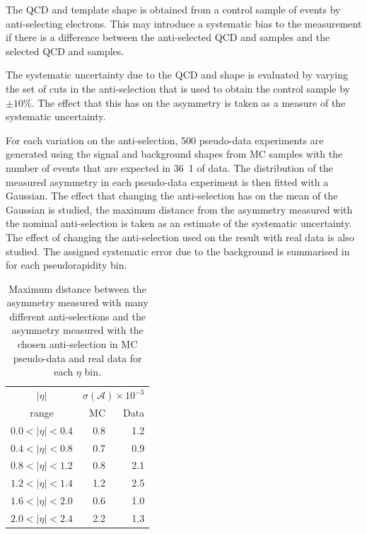 The {QCD} and \gjet \ETm template shape is obtained from a control sample of
events by anti-selecting electrons. This may introduce a systematic bias to the
measurement if there is a difference between the anti-selected {QCD} and \gjet
\ETm samples and the selected {QCD} and \gjet samples.

The systematic uncertainty due to the {QCD} and \gjet \ETm shape is evaluated by
varying the set of cuts in the anti-selection that is used to obtain the control
sample by $\pm10\%$. The effect that this has on the asymmetry is taken
as a measure of the systematic uncertainty.

For each variation on the anti-selection, 500 pseudo-data experiments are
generated using the signal and background \ETm shapes from MC samples with the
number of events that are expected in \unit{36.1}{\invpb} of data. The
distribution of the measured asymmetry in each pseudo-data experiment is then
fitted with a Gaussian.  The effect that changing the anti-selection has on the
mean of the Gaussian is studied, the maximum distance from the asymmetry
measured with the nominal anti-selection is taken as an estimate of the
systematic uncertainty.  The effect of changing the anti-selection used on the
result with real data is also studied.  The assigned systematic error due to the
background is summarised in  for each pseudorapidity bin.

\begin{table}[htbp]
\begin{center}
\begin{tabular}{crr}
    \toprule
$|\eta|$  &\multicolumn{2}{c}{ $\sigma(\mathcal{A}) \times 10^{-3}$}\\
   range      & MC & Data\\
\midrule
$0.0<|\eta|<0.4$ & 0.8 & 1.2\\
$0.4<|\eta|<0.8$ & 0.7 & 0.9\\
$0.8<|\eta|<1.2$ & 0.8 & 2.1\\
$1.2<|\eta|<1.4$ & 1.2 & 2.5\\
$1.6<|\eta|<2.0$ & 0.6 & 1.0\\
$2.0<|\eta|<2.4$ & 2.2 & 1.3\\
    \bottomrule
\end{tabular}
\caption[Maximum distance between the asymmetry measured with many different anti-selections
and the asymmetry measured with the chosen anti-selection in MC pseudo-data and
real data.]{Maximum distance between the asymmetry measured with many different anti-selections
and the asymmetry measured with the chosen anti-selection in MC pseudo-data and
real data for each $\eta$ bin\cite{baisini2010electron}.}
\label{tab:systQCD}
\end{center}
\end{table}


